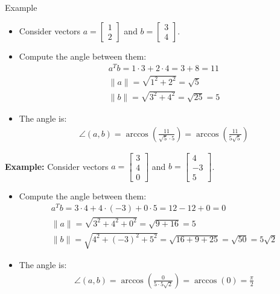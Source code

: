 \begin{frame}{Example}
    \begin{itemize}
        \item Consider vectors $a = \begin{bmatrix} 1 \\ 2 \end{bmatrix}$ and $b = \begin{bmatrix} 3 \\ 4 \end{bmatrix}$.
        \item Compute the angle between them:
        \begin{align*}
            a^T b = 1 \cdot 3 + 2 \cdot 4 = 3 + 8 = 11\\
            \|a\| = \sqrt{1^2 + 2^2} = \sqrt{5}\\
            \|b\| = \sqrt{3^2 + 4^2} = \sqrt{25} = 5
        \end{align*}
        \item The angle is:
        \begin{align*}
            \angle(a, b) = \arccos\left(\frac{11}{\sqrt{5} \cdot 5}\right) = \arccos\left(\frac{11}{5\sqrt{5}}\right)
        \end{align*}
    \end{itemize}
\end{frame}
\begin{frame}
    \textbf{Example:} Consider vectors $a = \begin{bmatrix} 3 \\ 4 \\ 0 \end{bmatrix}$ and $b = \begin{bmatrix} 4 \\ -3 \\ 5 \end{bmatrix}$.
    \begin{itemize}
        \item Compute the angle between them:
        \begin{align*}
            a^T b = 3 \cdot 4 + 4 \cdot (-3) + 0 \cdot 5 = 12 - 12 + 0 = 0\\
            \|a\| = \sqrt{3^2 + 4^2 + 0^2} = \sqrt{9 + 16} = 5\\
            \|b\| = \sqrt{4^2 + (-3)^2 + 5^2} = \sqrt{16 + 9 + 25} = \sqrt{50} = 5\sqrt{2}
        \end{align*}
        \item The angle is:
        \begin{align*}
            \angle(a, b) = \arccos\left(\frac{0}{5 \cdot 5\sqrt{2}}\right) = \arccos(0) = \frac{\pi}{2}
        \end{align*}
    \end{itemize}
\end{frame}

